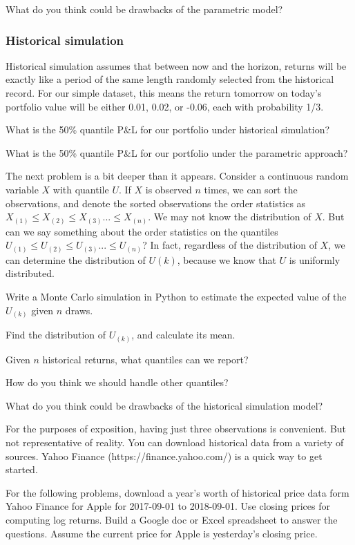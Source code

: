 \documentclass{report}
\numberwithin{problem}{chapter} %
\let\oldroblem\problem
\renewcommand{\problem}{ \oldroblem  \normalfont}
\newcommand{\vs}{\vspace}
\newcommand{\pnl}{P\&L }
\begin{document}
\problem What do you think could be drawbacks of the parametric model?

\subsubsection{Historical simulation}
Historical simulation assumes that between now and the horizon, returns will be exactly like a period of the same length randomly selected from the historical record. For our simple dataset, this means the return tomorrow on today's portfolio value will be either 0.01, 0.02, or -0.06, each with probability 1/3.

\problem What is the 50\% quantile \pnl for our portfolio under historical simulation? 

\problem What is the 50\% quantile \pnl for our portfolio under the parametric approach?

The next problem is a bit deeper than it appears. Consider a continuous random variable $X$ with quantile $U$. If $X$ is  observed $n$ times, we can sort the observations, and denote the sorted observations the order statistics as $X_{(1)} \leq X_{(2)} \leq X_{(3)} ...  \leq X_{(n)}$. We may not know the distribution of $X$. But can we say something about the order statistics on the quantiles $U_{(1)} \leq U_{(2)} \leq U_{(3)} ...  \leq U_{(n)}$? In fact, regardless of the distribution of $X$, we can determine the distribution of $U(k)$, because we know that $U$ is uniformly distributed.

\problem Write a Monte Carlo simulation in Python to estimate the expected value of the $U_{(k)}$ given $n$ draws. 

\problem Find the distribution of $U_{(k)}$, and calculate its mean. 

\problem Given $n$ historical returns, what quantiles can we report? 

\problem How do you think we should handle other quantiles?

\problem What do you think could be drawbacks of the historical simulation model?


\vs{1cm}
For the purposes of exposition, having just three observations is convenient. But not representative of reality. You can download historical data from a variety of sources. Yahoo Finance (https://finance.yahoo.com/) is a quick way to get started. 

For the following problems, download a year's worth of historical price data form Yahoo Finance for Apple for 2017-09-01 to 2018-09-01. Use closing prices for computing log returns.  Build a Google doc or Excel spreadsheet to answer the questions. Assume the current price for Apple is yesterday's closing price. 
\end{document}
